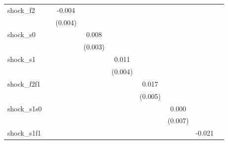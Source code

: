 {\begin{tabular}{l*{8}{c}}
\addlinespace
shock\_f2    &                     &      -0.004         &                     &                     &                     &                     &                     &                     \\
            &                     &     (0.004)         &                     &                     &                     &                     &                     &                     \\
\addlinespace
shock\_s0    &                     &                     &       0.008\sym{**} &                     &                     &                     &                     &                     \\
            &                     &                     &     (0.003)         &                     &                     &                     &                     &                     \\
\addlinespace
shock\_s1    &                     &                     &                     &       0.011\sym{**} &                     &                     &                     &                     \\
            &                     &                     &                     &     (0.004)         &                     &                     &                     &                     \\
\addlinespace
shock\_f2f1  &                     &                     &                     &                     &       0.017\sym{***}&                     &                     &                     \\
            &                     &                     &                     &                     &     (0.005)         &                     &                     &                     \\
\addlinespace
shock\_s1s0  &                     &                     &                     &                     &                     &       0.000         &                     &                     \\
            &                     &                     &                     &                     &                     &     (0.007)         &                     &                     \\
\addlinespace
shock\_s1f1  &                     &                     &                     &                     &                     &                     &      -0.021         &                     \\

\end{tabular}}
